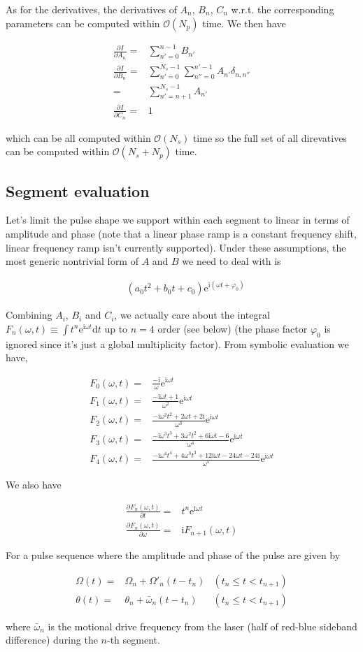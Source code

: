 \documentclass[10pt,fleqn]{article}
\newcommand{\ud}{\mathrm{d}}
\newcommand{\ue}{\mathrm{e}}
\newcommand{\ui}{\mathrm{i}}
\newcommand{\eqar}[1]
{
  \begin{align*}
    #1
  \end{align*}
}
\newcommand{\paren}[1]{{\left({#1}\right)}}
\newcommand{\pdiff}[3][{}]{{\frac{\partial^{#1} {#2}}{\partial {#3}{}^{#1}}}}
\begin{document}
As for the derivatives, the derivatives of $A_n$, $B_n$, $C_n$ w.r.t.
the corresponding parameters can be computed within $\mathcal{O}(N_p)$ time.
We then have
\eqar{
  \pdiff{I}{A_n}=&\sum_{n'=0}^{n-1}B_{n'}\\
  \pdiff{I}{B_n}=&\sum_{n'=0}^{N_s-1}\sum_{n''=0}^{n'-1}A_{n'}\delta_{n,n''}\\
  =&\sum_{n'=n+1}^{N_s-1}A_{n'}\\
  \pdiff{I}{C_n}=&1
}
which can be all computed within $\mathcal{O}(N_s)$ time so the full set of
all direvatives can be computed within $\mathcal{O}(N_s+N_p)$ time.

\subsection{Segment evaluation}
Let's limit the pulse shape we support within each segment to linear in terms of
amplitude and phase (note that a linear phase ramp is a constant frequency shift,
linear frequency ramp isn't currently supported).
Under these assumptions, the most generic nontrivial form of $A$ and $B$
we need to deal with is
\eqar{
  &(a_0t^2 + b_0t + c_0)\ue^{\ui \paren{\omega t + \varphi_0}}
}
Combining $A_i$, $B_i$ and $C_i$, we actually care about the integral
$\displaystyle F_n(\omega, t)\equiv\int t^n\ue^{\ui\omega t}\ud t$
up to $n=4$ order (see below) (the phase factor $\varphi_0$ is ignored
since it's just a global multiplicity factor). From symbolic evaluation we have,
\eqar{
  F_0(\omega, t)=&\frac{-\ui}{\omega}\ue^{\ui\omega t}\\
  F_1(\omega, t)=&\frac{-\ui\omega t + 1}{\omega^2}\ue^{\ui\omega t}\\
  F_2(\omega, t)=&\frac{-\ui\omega^2t^2+2\omega t+2\ui}{\omega^3}\ue^{\ui\omega t}\\
  F_3(\omega, t)=&\frac{-\ui\omega^3t^3+3\omega^2t^2+6\ui\omega t-6}{\omega^4}\ue^{\ui\omega t}\\
  F_4(\omega, t)=&\frac{-\ui\omega^4t^4+4\omega^3t^3+12\ui\omega t-24\omega t-24\ui}{\omega^5}\ue^{\ui\omega t}
}
We also have
\eqar{
  \pdiff{F_n(\omega, t)}{t}=&t^n\ue^{\ui\omega t}\\
  \pdiff{F_n(\omega, t)}{\omega}=&\ui F_{n+1}(\omega, t)
}

For a pulse sequence where the amplitude and phase of the pulse are given by
\eqar{
  \Omega(t)=&\Omega_n+\Omega'_n\paren{t-t_n}&(t_n\leqslant t<t_{n+1})\\
  \theta(t)=&\theta_n+\bar\omega_n\paren{t-t_n}&(t_n\leqslant t<t_{n+1})
}
where $\bar\omega_n$ is the motional drive frequency from the laser
(half of red-blue sideband difference) during the $n$-th segment.\\
\end{document}
